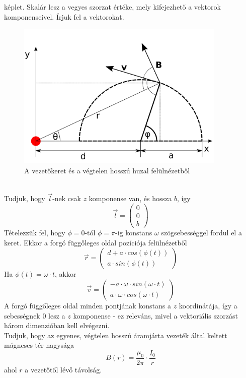\documentclass[11pt,a4paper,openany,leqno]{article}
\begin{document}
képlet. Skalár lesz a vegyes szorzat értéke, mely kifejezhető a vektorok komponenseivel. Írjuk fel a vektorokat.
\begin{figure}[h!]
\centering
  \includegraphics[width=100mm,scale=0.5]{kep3.pdf}
  \caption{A vezetőkeret és a végtelen hosszú huzal felülnézetből}
  \label{}
\end{figure}\\ \indent
Tudjuk, hogy $\vec{l}$-nek csak $z$ komponense van, és hossza $b$, így \\
$$ \vec{l} = \begin{pmatrix} 0 \\ 0 \\ b \end{pmatrix}$$ \indent
Tételezzük fel, hogy $\phi = 0$-tól $\phi=\pi$-ig konstans $\omega$ szögsebességgel fordul el a keret. Ekkor a forgó függőleges oldal pozíciója felülnézetből \\
$$ \vec{r} = \begin{pmatrix} d + a \cdot cos(\phi(t)) \\ a \cdot sin(\phi(t)) \end{pmatrix}$$\indent
Ha $\phi(t) = \omega \cdot t$, akkor
$$ \vec{v} = \begin{pmatrix} - a \cdot \omega \cdot sin(\omega\cdot t) \\ a\cdot \omega \cdot cos(\omega \cdot t) \end{pmatrix} $$\indent
A forgó függőleges oldal minden pontjának konstans a $z$ koordinátája, így a sebességnek $0$ lesz a $z$ komponense - ez releváns, mivel a vektoriális szorzást három dimenzióban kell elvégezni.\\ \indent
Tudjuk, hogy az egyenes, végtelen hosszú áramjárta vezeték által keltett mágneses tér nagysága
$$ B(r) = \frac{\mu_0}{2\pi}\cdot \frac{I_0}{r} $$
ahol $r$ a vezetőtől lévő távolság.\\ \indent
\end{document}
